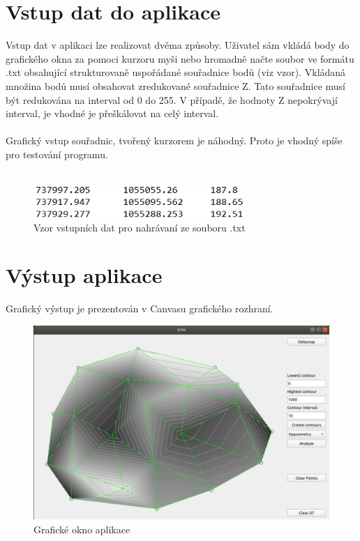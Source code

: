 \documentclass[a4paper, 12pt]{article}
\begin{document}
\section{Vstup dat do aplikace}
Vstup dat v aplikaci lze realizovat dvěma způsoby. Uživatel sám vkládá body do grafického okna za pomoci kurzoru myši nebo hromadně načte soubor ve formátu .txt obsahující strukturovaně uspořádané souřadnice bodů (viz vzor). Vkládaná množina bodů musí obsahovat zredukované souřadnice Z. Tato souřadnice musí být redukována na interval od 0 do 255. V případě, že hodnoty Z nepokrývají interval, je vhodné je přeškálovat na celý interval.\\
\\
Grafický vstup souřadnic, tvořený kurzorem je náhodný. Proto je vhodný spíše pro testování programu.\\
\\
 
\begin{figure}[h!]
	\centering
	\includegraphics[width=8cm]{data.jpg}
	\caption{Vzor vstupních dat pro nahrávaní ze souboru .txt}
\end{figure}

\section{Výstup aplikace}
Grafický výstup je prezentován v Canvasu grafického rozhraní.

\begin{figure}[h!]
	\centering
	\includegraphics[width=12cm]{vystup.jpg}
	\caption{Grafické okno aplikace}
\end{figure}
\end{document}
